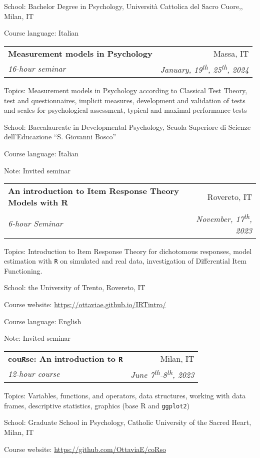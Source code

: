 \documentclass[letterpaper,12pt]{article}
\makeatletter
\newcommand{\resumeSubheading}[4]{
  \vspace{-1pt}\item
    \begin{tabular*}{0.97\textwidth}{l@{\extracolsep{\fill}}r}
      \textbf{#1} & #2 \\
      \textit{\small#3} & \textit{\small #4} \\
    \end{tabular*}\vspace{-5pt}
}
\makeatother
\begin{document}
{\small School: Bachelor Degree in Psychology, Università Cattolica del Sacro Cuore,, Milan, IT} 

{\small Course language: Italian}

\resumeSubheading {Measurement models in Psychology}{Massa, IT}{16-hour seminar}{January, 19\textsuperscript{th}, 25\textsuperscript{th}, 2024}

{\small Topics: Measurement models in Psychology according to Classical Test Theory, test and questionnaires, implicit measures, development and validation of tests and scales for psychological assessment, typical and maximal performance tests}

{\small School: Baccalaureate in Developmental Psychology, Scuola Superiore di Scienze dell'Educazione ``S. Giovanni Bosco''}

{\small Course language: Italian}

{\small Note: Invited seminar}

\resumeSubheading {An introduction to Item Response Theory Models with R}{Rovereto, IT}{6-hour Seminar}{November, 17\textsuperscript{th}, 2023}

{\small Topics: Introduction to Item Response Theory for dichotomous responses, model estimation with \texttt{R} on simulated and real data, investigation of Differential Item Functioning. }

{\small School: the University of Trento, Rovereto, IT} 


{\small Course website:  \href{https://ottaviae.github.io/IRTintro/}{https://ottaviae.github.io/IRTintro/}} 

{\small Course language: English}

{\small Note: Invited seminar}

\resumeSubheading {cou\texttt{R}se: An introduction to \texttt{R}}{Milan, IT}{12-hour course}{\small{June 7\textsuperscript{th}-8\textsuperscript{th}, 2023}}

{\small Topics: Variables, functions, and operators, data structures, working with data frames, descriptive statistics, graphics (base R and \texttt{ggplot2})}

{\small School: Graduate School in Psychology, Catholic University of the Sacred Heart, Milan,  IT} 


{\small Course website:  \href{https://github.com/OttaviaE/coRso}{https://github.com/OttaviaE/coRso}} 
\end{document}
